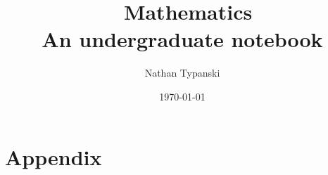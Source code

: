 \documentclass[fontsize=10pt,twoside,BCOR=12mm,DIV=calc]{scrbook}
\begin{document}


\title{\textbf{\
Mathematics
}\\An undergraduate notebook}
\author    {Nathan Typanski}
\date      {\today}
\maketitle

\newpage

\cleardoublepage

\newpage

\edef\marginnotetextwidth{\the\textwidth}




%
\part{Appendix}

%

\printindex



\end{document}
